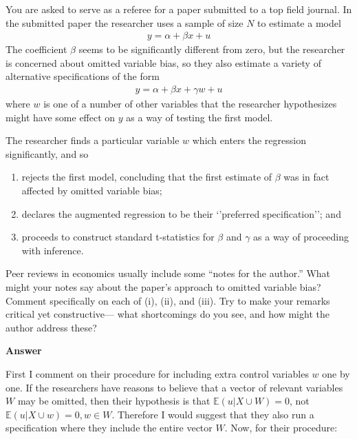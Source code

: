 \documentclass[11pt]{exam}
\begin{document}
You are asked to serve as a referee for a paper submitted to a top field
journal. In the submitted paper the researcher uses a sample of size
\(N\) to estimate a model
\begin{align*}
y = \alpha + \beta x + u
\end{align*}
The coefficient \(\beta\) seems to be significantly different from zero,
but the researcher is concerned about omitted variable bias, so they
also estimate a variety of alternative specifications of the form
\begin{align*}
y = \alpha + \beta x + \gamma w + u
\end{align*}
where \(w\) is one of a number of other variables that the researcher
hypothesizes might have some effect on $y$ as a way of testing the first
model.

The researcher finds a particular variable \(w\) which enters the
regression significantly, and so

\begin{enumerate}
\def\labelenumi{(\roman{enumi})}
\item
  rejects the first model, concluding that the first estimate of
  \(\beta\) was in fact affected by omitted variable bias;
\item
  declares the augmented regression to be their `'preferred
  specification''; and
\item
  proceeds to construct standard t-statistics for \(\beta\) and
  \(\gamma\) as a way of proceeding with inference.
\end{enumerate}

Peer reviews in economics usually include some ``notes for the author.''
What might your notes say about the paper's approach to omitted variable
bias? Comment specifically on each of (i), (ii), and (iii). Try to make
your remarks critical yet constructive--- what shortcomings do you see,
and how might the author address these?

    \textbf{Answer}

First I comment on their procedure for including extra control variables
\(w\) one by one. If the researchers have reasons to believe that a
vector of relevant variables \(W\) may be omitted, then their hypothesis
is that \(\mathbb{E}(u|X\cup W) = 0\), not
\(\mathbb{E}(u|X\cup w) = 0, w\in W\). Therefore I would suggest that
they also run a specification where they include the entire vector
\(W\). Now, for their procedure:
\end{document}

